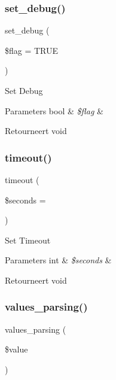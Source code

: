 \subsubsection{\texorpdfstring{set\_debug()}{set\_debug()}}
{\footnotesize\ttfamily set\+\_\+debug (\begin{DoxyParamCaption}\item[{}]{\$flag = {\ttfamily TRUE} }\end{DoxyParamCaption})}

Set Debug


\begin{DoxyParams}[1]{Parameters}
bool & {\em \$flag} & \\
\hline
\end{DoxyParams}
\begin{DoxyReturn}{Retourneert}
void 
\end{DoxyReturn}
\mbox{\label{class_c_i___xmlrpc_ada3149e6290a7991c7dfc88c6c90f2db}} 
\subsubsection{\texorpdfstring{timeout()}{timeout()}}
{\footnotesize\ttfamily timeout (\begin{DoxyParamCaption}\item[{}]{\$seconds = {} }\end{DoxyParamCaption})}

Set Timeout


\begin{DoxyParams}[1]{Parameters}
int & {\em \$seconds} & \\
\hline
\end{DoxyParams}
\begin{DoxyReturn}{Retourneert}
void 
\end{DoxyReturn}
\mbox{\label{class_c_i___xmlrpc_ae22fc267af5ff6330cb47172c78cc2c8}} 
\subsubsection{\texorpdfstring{values\_parsing()}{values\_parsing()}}
{\footnotesize\ttfamily values\+\_\+parsing (\begin{DoxyParamCaption}\item[{}]{\$value }\end{DoxyParamCaption})}

